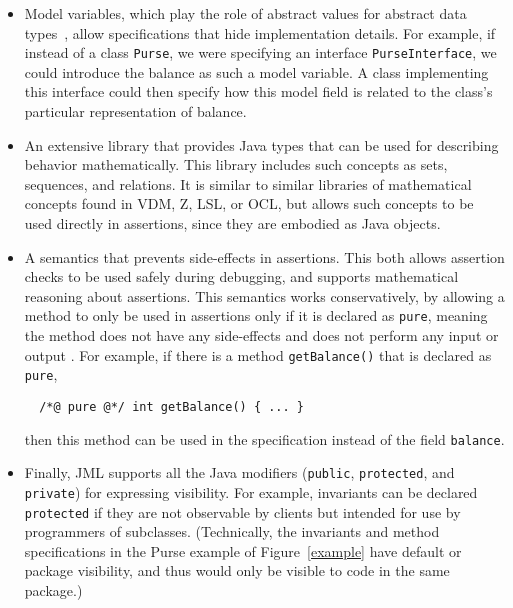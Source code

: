 \begin{itemize}
\item Model variables, which play the role of abstract values for
  abstract data types~\cite{Cheon-etal03}, allow specifications that
  hide implementation details.
  For example, if instead of a class {\tt Purse}, we were specifying
  an interface {\tt PurseInterface}, we could introduce the balance as
  such a model variable.  A class implementing this interface could
  then specify how this model field is related to the class's
  particular representation of balance.
  
\item An extensive library that provides Java types that can be used
  for describing behavior mathematically.  This library includes such
  concepts as sets, sequences, and relations.  It is similar to
  similar libraries of mathematical concepts found in VDM, Z, LSL, or
  OCL, but allows such concepts to be used directly in assertions,
  since they are embodied as Java objects.
  
\item A semantics that prevents side-effects in assertions.  This
  both allows assertion checks to be used safely during debugging, and
  supports mathematical reasoning about assertions.
  This semantics works conservatively, by allowing a method to only be
  used in assertions only if it is declared as 
  {\tt pure}, meaning the method does not have any side-effects and
  does not perform any input or output \cite{Leavens-Baker-Ruby03}.
  For example, if there is a method {\tt getBalance()} that is
  declared as {\tt pure},
\begin{verbatim}
  /*@ pure @*/ int getBalance() { ... }
\end{verbatim}
  then this method can be used in the specification instead of the field
  {\tt balance}.
\item Finally, JML supports all the Java modifiers ({\tt public},
  {\tt protected}, and {\tt private}) for expressing visibility.  For
  example, invariants can be declared {\tt protected} if
  they are not observable by clients but intended for use by
  programmers of subclasses.  (Technically, the invariants and method
  specifications in the Purse example of Figure~\ref{example} have default
  or package visibility, and thus would only be visible to code in the
  same package.)
\end{itemize}

